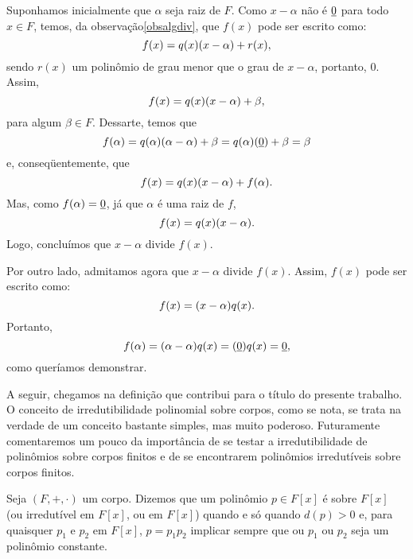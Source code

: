 \begin{dem}
  Suponhamos inicialmente que $\alpha$ seja raiz de $F$.
  Como $x-\alpha$ não é $\underline{0}$ para todo $x\in F$, temos, da
  observação\xspace\ref{obsalgdiv}, que $f(x)$ pode ser escrito como:
  \begin{equation*}
    f(x) = q(x)(x-\alpha)+r(x)\mathrm{,}
  \end{equation*}
  sendo $r(x)$ um polinômio de grau menor que o grau de $x-\alpha$,
  portanto, $0$. Assim,
  \begin{equation*}
    f(x) = q(x)(x-\alpha)+\beta\mathrm{,}
  \end{equation*}
  para algum $\beta\in F$. Dessarte, temos que
  \begin{equation*}
    f(\alpha) = q(\alpha)(\alpha-\alpha)+\beta
    = q(\alpha)(\underline{0})+\beta = \beta
  \end{equation*}
  e, conseqüentemente, que
  \begin{equation*}
    f(x) = q(x)(x-\alpha)+f(\alpha)\mathrm{.}
  \end{equation*}
  Mas, como $f(\alpha)=\underline{0}$, já que $\alpha$ é uma raiz de $f$,
  \begin{equation*}
    f(x) = q(x)(x-\alpha)\mathrm{.}
  \end{equation*}
  Logo, concluímos que $x-\alpha$ divide $f(x)$.

  Por outro lado, admitamos agora que $x-\alpha$ divide $f(x)$. Assim,
  $f(x)$ pode ser escrito como:
  \begin{equation*}
    f(x) = (x-\alpha)q(x)\mathrm{.}
  \end{equation*}
  Portanto,
  \begin{equation*}
    f(\alpha) = (\alpha-\alpha)q(x) = (\underline{0})q(x) = \underline{0}\mathrm{,}
  \end{equation*}
  como queríamos demonstrar.
\end{dem}

A seguir, chegamos na definição que contribui para o título do presente
trabalho. O conceito de irredutibilidade polinomial sobre corpos,
como se nota,
se trata na verdade de um conceito bastante simples, mas muito
poderoso. Futuramente comentaremos um pouco da importância de se testar
a irredutibilidade de polinômios sobre corpos finitos e de se
encontrarem polinômios irredutíveis sobre corpos finitos.

\begin{Def}
  Seja $(F,+,\cdot)$ um corpo.
  Dizemos que um polinômio $p\in F[x]$ é
   sobre $F[x]$ (ou
  irredutível em $F[x]$, ou
   em $F[x]$)
  quando e só quando $d(p)>0$ e, para quaisquer $p_1$ e $p_2$ em
  $F[x]$,
  $p=p_1p_2$
  implicar sempre que ou $p_1$ ou $p_2$
  seja um polinômio constante.
\end{Def}


